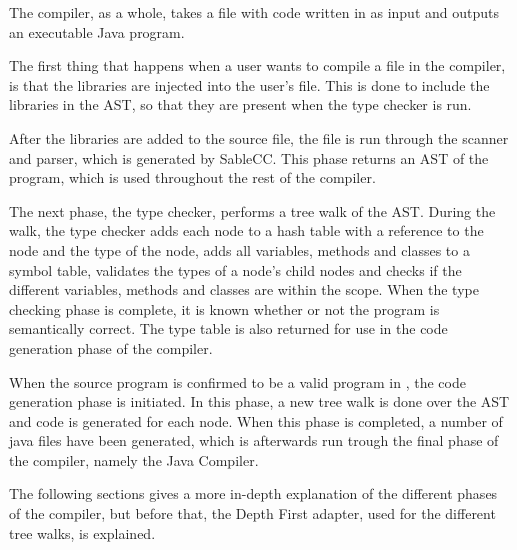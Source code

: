 The \lang{} compiler, as a whole, takes a file with code written in \lang{} as input and outputs an executable Java program.

The first thing that happens when a user wants to compile a \lang{} file in the \lang{} compiler, is that the \lang{} libraries are injected into the user's file. This is done to include the libraries in the AST, so that they are present when the type checker is run.

After the libraries are added to the source file, the file is run through the scanner and parser, which is generated by SableCC. This phase returns an AST of the program, which is used throughout the rest of the compiler.

The next phase, the type checker, performs a tree walk of the AST. During the walk, the type checker adds each node to a hash table with a reference to the node and the type of the node, adds all variables, methods and classes to a symbol table, validates the types of a node's child nodes and checks if the different variables, methods and classes are within the scope. When the type checking phase is complete, it is known whether or not the \lang{} program is semantically correct. The type table is also returned for use in the code generation phase of the compiler.

When the source program is confirmed to be a valid program in \lang{}, the code generation phase is initiated. In this phase, a new tree walk is done over the AST and code is generated for each node. When this phase is completed, a number of java files have been generated, which is afterwards run trough the final phase of the compiler, namely the Java Compiler.

The following sections gives a more in-depth explanation of the different phases of the \lang{} compiler, but before that, the Depth First adapter, used for the different tree walks, is explained.

